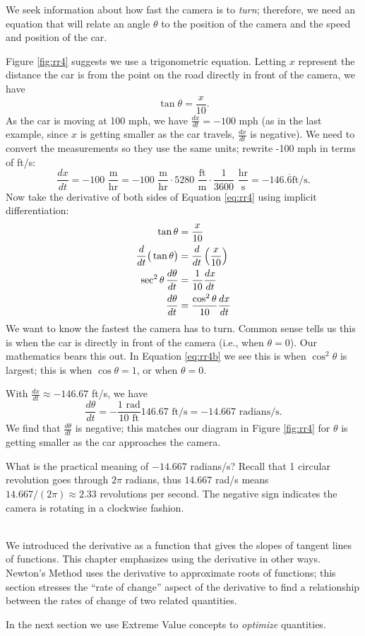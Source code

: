 {We seek information about how fast the camera is to \textit{turn}; therefore, we need an equation that will relate an angle $\theta$ to the position of the camera and the speed and position of the car.

Figure \ref{fig:rr4} suggests we use a trigonometric equation. Letting $x$ represent the distance the car is from the point on the road directly in front of the camera, we have \begin{equation}\tan \theta = \frac{x}{10}.\label{eq:rr4}\end{equation} As the car is moving at 100 mph, we have $\frac{dx}{dt} = -100$ mph (as in the last example, since $x$ is getting smaller as the car travels, $\frac{dx}{dt}$ is negative). We need to convert the measurements so they use the same units; rewrite -100 mph in terms of ft/s:
\[
\frac{dx}{dt} = -100\,\,\frac{\text{m}}{\text{hr}} = -100\,\,\frac{\text{m}}{\text{hr}}\cdot5280\,\,\frac{\text{ft}}{\text{m}}\cdot\frac{1}{3600}\,\,\frac{\text{hr}}{\text{s}} =-146.\overline{6}\text{ft/s}.
\]
Now take the derivative of both sides of Equation \eqref{eq:rr4} using implicit differentiation:
\begin{align}
		\tan \theta &= \frac{x}{10} \notag \\
		\frac{d}{dt}\big(\tan \theta\big) &= \frac{d}{dt}\left(\frac{x}{10}\right)\notag \\
		\sec^2\theta\,\frac{d\theta}{dt} &= \frac{1}{10}\frac{dx}{dt}\notag\\
		\frac{d\theta}{dt} &= \frac{\cos^2\theta}{10}\frac{dx}{dt}\label{eq:rr4b}
\end{align}
We want to know the fastest the camera has to turn. Common sense tells us this is when the car is directly in front of the camera (i.e., when $\theta = 0$). Our mathematics bears this out. In Equation \eqref{eq:rr4b} we see this is when $\cos^2\theta$ is largest; this is when $\cos \theta = 1$, or when $\theta = 0$.

With $\frac{dx}{dt} \approx -146.67$ ft/s, we have 
	\[
	\frac{d\theta}{dt} = -\frac{1\text{ rad}}{10\text{ ft}}146.67\text{ ft/s} = -14.667\text{ radians/s}.
	\]
We find that $\frac{d\theta}{dt}$ is negative; this matches our diagram in Figure \ref{fig:rr4} for $\theta$ is getting smaller as the car approaches the camera.	
	
What is the practical meaning of $-14.667$ radians/s? Recall that 1 circular revolution goes through $2\pi$ radians, thus $14.667$ rad/s means $14.667/(2\pi)\approx 2.33$ revolutions per second. The negative sign indicates the camera is rotating in a clockwise fashion.
}\\

We introduced the derivative as a function that gives the slopes of tangent lines of functions. This chapter emphasizes using the derivative in other ways. Newton's Method uses the derivative to approximate roots of functions; this section stresses the ``rate of change'' aspect of the derivative to find a relationship between the rates of change of two related quantities. 

In the next section we use Extreme Value concepts to \textit{optimize} quantities. 

